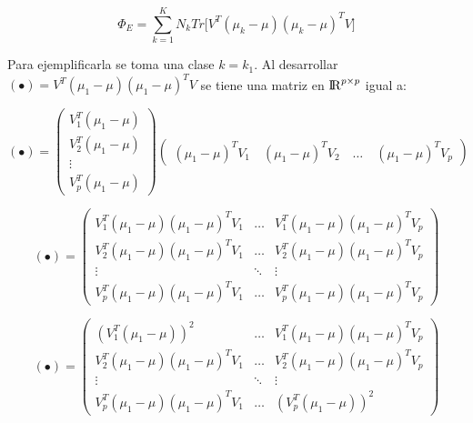 \begin{equation}\label{eq:2.18}
\Phi_E = \sum\limits_{k = 1}^{K} N_{k} Tr \big[ V^T (\mu_k - \mu) (\mu_k - \mu)^T V \big]	
\end{equation}

Para ejemplificarla se toma una clase $k = k_1$.  Al desarrollar $(\bullet) = V^T (\mu_1 - \mu) (\mu_1 - \mu)^T V$ se tiene una matriz en ${\rm I\!R}^{p \times p}$ igual a:


\begin{equation*}
(\bullet)= \left(\!
    \begin{array}{c}
      V_1^T (\mu_1-\mu)\\
      V_2^T (\mu_1-\mu)\\
      \vdots \\
      V_p^T (\mu_1-\mu)
    \end{array}
  \!\right) 
  \left(\!\begin{array}{c}
      (\mu_1-\mu)^T V_1 \quad
      (\mu_1-\mu)^T V_2 \quad
      \hdots \quad
      (\mu_1-\mu)^T V_p
    \end{array}
  \!\right) 
\end{equation*} 

\vspace{5mm}

\begin{equation*}
(\bullet)= \left(\!
    \begin{array}{ccc}
      V_1^T (\mu_1-\mu) (\mu_1-\mu)^T V_1 & \hdots & V_1^T (\mu_1-\mu) (\mu_1-\mu)^T V_p  \\
      V_2^T (\mu_1-\mu) (\mu_1-\mu)^T V_1 & \hdots & V_2^T (\mu_1-\mu) (\mu_1-\mu)^T V_p  \\
      \vdots & \ddots & \vdots\\
      V_p^T (\mu_1-\mu) (\mu_1-\mu)^T V_1 & \hdots & V_p^T (\mu_1-\mu) (\mu_1-\mu)^T V_p
    \end{array}
  \!\right) 
\end{equation*} 

\vspace{5mm}

\begin{equation*}
(\bullet)= \left(\!
    \begin{array}{ccc}
      (V_1^T (\mu_1-\mu))^2 & \hdots & V_1^T (\mu_1-\mu) (\mu_1-\mu)^T V_p \\
       V_2^T (\mu_1-\mu) (\mu_1-\mu)^T V_1  & \hdots & V_2^T (\mu_1-\mu) (\mu_1-\mu)^T V_p  \\
      \vdots & \ddots & \vdots\\
      V_p^T (\mu_1-\mu) (\mu_1-\mu)^T V_1  & \hdots & (V_p^T (\mu_1-\mu))^2
    \end{array}
  \!\right) 
\end{equation*} 

